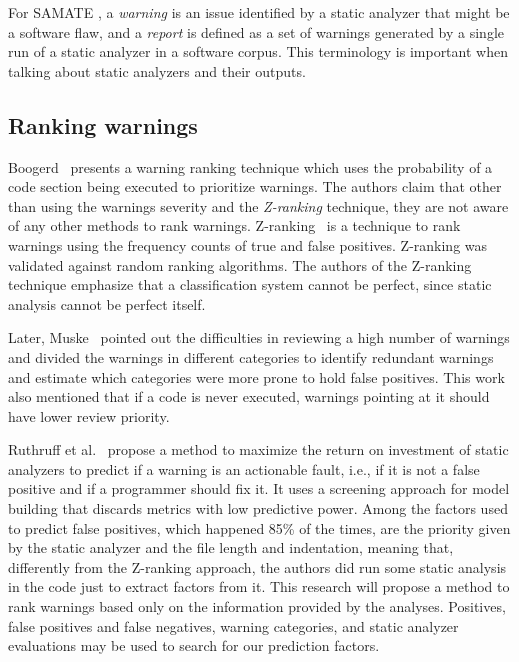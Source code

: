 For SAMATE \cite{black_counting_2011}, a \textit{warning} is an issue identified
by a static analyzer that might be a software flaw, and a \textit{report} is
defined as a set of warnings generated by a single run of a static analyzer in
a software corpus. This terminology is important when talking about static
analyzers and their outputs.

\subsection{Ranking warnings}
\label{ranking_warnings_review}

Boogerd~\cite{boogerd2006prioritizing} presents a warning ranking technique
which uses the probability of a code section being executed to prioritize
warnings. The authors claim that other than using the warnings severity and
the \textit{Z-ranking} technique, they are not aware of any other methods to
rank warnings. Z-ranking~\cite{kremenek2003z} is a technique to rank warnings
using the frequency counts of true and false positives. Z-ranking was validated
against random ranking algorithms. The authors of the Z-ranking technique
emphasize that a classification system cannot be perfect, since static analysis
cannot be perfect itself.

Later, Muske~\cite{muske2013review} pointed out the difficulties in reviewing a high
number of warnings and divided the warnings in different categories to identify
redundant warnings and estimate which categories were more prone to hold false
positives. This work also mentioned that if a code is never executed,
warnings pointing at it should have lower review priority.

Ruthruff et al.~\cite{ruthruff_predicting_2008} propose a method to maximize
the return on investment of static analyzers to predict if a warning is an
actionable fault, i.e., if it is not a false positive and if a programmer
should fix it. It uses a screening approach for model building that discards
metrics with low predictive power. Among the factors used to predict false
positives, which happened 85\% of the times, are the priority given by the
static analyzer and the file length and indentation, meaning that, differently
from the Z-ranking approach, the authors did run some static analysis in the
code just to extract factors from it. This research will propose a method to
rank warnings based only on the information provided by the analyses.
Positives, false positives and false negatives, warning categories, and static
analyzer evaluations may be used to search for our prediction factors.

